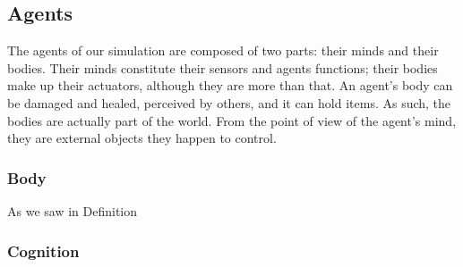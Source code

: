 \subsection{Agents}

The agents of our simulation are composed of two parts: their minds and their bodies. Their minds constitute their sensors and agents functions; their bodies make up their actuators, although they are more than that. An agent's body can be damaged and healed, perceived by others, and it can hold items. As such, the bodies are actually part of the world. From the point of view of the agent's mind, they are external objects they happen to control.

\subsubsection{Body}

As we saw in Definition~

\subsubsection{Cognition}